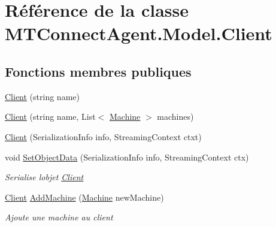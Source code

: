 \hypertarget{class_m_t_connect_agent_1_1_model_1_1_client}{}\section{Référence de la classe M\+T\+Connect\+Agent.\+Model.\+Client}
\label{class_m_t_connect_agent_1_1_model_1_1_client}
\subsection*{Fonctions membres publiques}
\begin{DoxyCompactItemize}
\item 
\mbox{\hyperlink{class_m_t_connect_agent_1_1_model_1_1_client_ad2d781a6f230ec83ccee4f7221a5a577}{Client}} (string name)
\item 
\mbox{\hyperlink{class_m_t_connect_agent_1_1_model_1_1_client_ac519ea113d1eae1e94b96052c6ccfec6}{Client}} (string name, List$<$ \mbox{\hyperlink{class_m_t_connect_agent_1_1_model_1_1_machine}{Machine}} $>$ machines)
\item 
\mbox{\hyperlink{class_m_t_connect_agent_1_1_model_1_1_client_a1418f6bce9620188070855acae02aaeb}{Client}} (Serialization\+Info info, Streaming\+Context ctxt)
\item 
void \mbox{\hyperlink{class_m_t_connect_agent_1_1_model_1_1_client_a707b7a8486e7ee79d9986f6aa1729f4e}{Set\+Object\+Data}} (Serialization\+Info info, Streaming\+Context ctx)
\begin{DoxyCompactList}\small\item\em Serialise l\textquotesingle{}objet \mbox{\hyperlink{class_m_t_connect_agent_1_1_model_1_1_client}{Client}} \end{DoxyCompactList}\item 
\mbox{\hyperlink{class_m_t_connect_agent_1_1_model_1_1_client}{Client}} \mbox{\hyperlink{class_m_t_connect_agent_1_1_model_1_1_client_a692b1cbfd5063222488d3af36d8fd703}{Add\+Machine}} (\mbox{\hyperlink{class_m_t_connect_agent_1_1_model_1_1_machine}{Machine}} new\+Machine)
\begin{DoxyCompactList}\small\item\em Ajoute une machine au client \end{DoxyCompactList}\end{DoxyCompactItemize}
